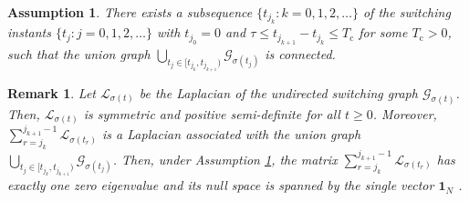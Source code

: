 \documentclass[twocolumn]{autart}
\newtheorem{Assumption}{Assumption}
\newtheorem{Remark}{Remark}
\begin{document}


\begin{Assumption}\label{Ass-jointly-connected}
  There exists a subsequence $\{t_{j_{k}}: k=0,1,2,\ldots\}$
  of the switching instants $\{t_{j}: j=0,1,2,\ldots\}$
  with $t_{j_{0}}=0$ and $ \tau \le t_{j_{k+1}}-t_{j_{k}} \le T_{\text{c}}$
  for some $T_{\text{c}}>0$, such that the union graph
  $\bigcup_{t_{j}\in [t_{j_{k}}, t_{j_{k+1}})}\mathcal{G}_{\sigma(t_{j})}$ is connected.
\end{Assumption}







\begin{Remark}\label{Remark-jointly-connected}
Let $\mathcal{L}_{\sigma(t)}$ be the Laplacian of the undirected switching graph $\mathcal{G}_{\sigma(t)}$.
Then, $\mathcal{L}_{\sigma(t)}$ is symmetric and positive semi-definite for all $t \ge 0$.
Moreover, $\sum_{r=j_{k}}^{j_{k+1}-1}\mathcal{L}_{\sigma(t_{r})}$ is a Laplacian associated with the union graph
$\bigcup_{t_{j}\in [t_{j_{k}}, t_{j_{k+1}})}\mathcal{G}_{\sigma(t_{j})}$.
Then, under Assumption \ref{Ass-jointly-connected},
the matrix $\sum_{r=j_{k}}^{j_{k+1}-1}\mathcal{L}_{\sigma(t_{r})}$ has exactly one zero eigenvalue
and its null space is spanned by the single vector $\mathbf{1}_{N}$ \citep{Lin06,SuHuang12Full}.
\end{Remark}
\end{document}
